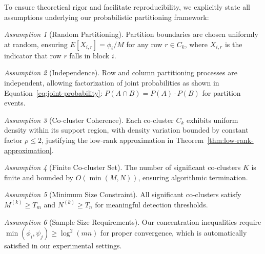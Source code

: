 \documentclass[journal]{IEEEtran}
\theoremstyle{definition}
\theoremstyle{remark} %
\newtheorem{assumption}{Assumption}
\begin{document}
{\color{blue}


    To ensure theoretical rigor and facilitate reproducibility, we explicitly state all assumptions underlying our probabilistic partitioning framework:

    \begin{assumption}[Random Partitioning]
        \label{assumption:random-partitioning}
        Partition boundaries are chosen uniformly at random, ensuring $E[X_{i,r}] = \phi_i/M$ for any row $r \in C_k$, where $X_{i,r}$ is the indicator that row $r$ falls in block $i$.
    \end{assumption}

    \begin{assumption}[Independence]
        \label{assumption:independence}
        Row and column partitioning processes are independent, allowing factorization of joint probabilities as shown in Equation~\eqref{eq:joint-probability}: $P(A \cap B) = P(A) \cdot P(B)$ for partition events.
    \end{assumption}

    \begin{assumption}[Co-cluster Coherence]
        \label{assumption:co-cluster-coherence}
        Each co-cluster $C_k$ exhibits uniform density within its support region, with density variation bounded by constant factor $\rho \leq 2$, justifying the low-rank approximation in Theorem~\ref{thm:low-rank-approximation}.
    \end{assumption}

    \begin{assumption}[Finite Co-cluster Set]
        \label{assumption:finite-co-cluster-set}
        The number of significant co-clusters $K$ is finite and bounded by $O(\min(M,N))$, ensuring algorithmic termination.
    \end{assumption}

    \begin{assumption}[Minimum Size Constraint]
        \label{assumption:minimum-size-constraint}
        All significant co-clusters satisfy $M^{(k)} \geq T_m$ and $N^{(k)} \geq T_n$ for meaningful detection thresholds.
    \end{assumption}

    \begin{assumption}[Sample Size Requirements]
        \label{assumption:sample-size-requirements}
        Our concentration inequalities require $\min(\phi_i, \psi_j) \geq \log^2(mn)$ for proper convergence, which is automatically satisfied in our experimental settings.
    \end{assumption}
}
\end{document}
